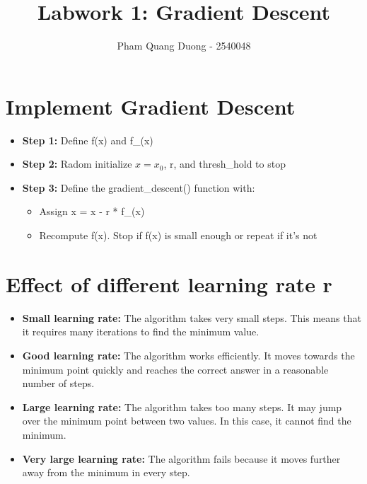 \documentclass{article}
\title{Labwork 1: Gradient Descent}
\author{Pham Quang Duong - 2540048}
\begin{document}
\maketitle


\section{Implement Gradient Descent}
\begin{itemize}
    \item[-] \textbf{Step 1:} Define f(x) and f\_(x)
    \item[-] \textbf{Step 2:} Radom initialize $x = x_0$, r, and thresh\_hold to stop
    \item[-] \textbf{Step 3:} Define the gradient\_descent() function with: 
    \begin{itemize}
        \item[$\bullet$]Assign x = x - r * f\_(x)
        \item[$\bullet$]Recompute f(x). Stop if f(x) is small enough or repeat if it's not
    \end{itemize}
\end{itemize}

\section{Effect of different learning rate r}
\begin{itemize}
    \item \textbf{Small learning rate:} The algorithm takes very small steps. This means that it requires many iterations to find the minimum value.
    
    \item \textbf{Good learning rate:} The algorithm works efficiently. It moves towards the minimum point quickly and reaches the correct answer in a reasonable number of steps.
    
    \item \textbf{Large learning rate:} The algorithm takes too many steps. It may jump over the minimum point between two values. In this case, it cannot find the minimum.
    
    \item \textbf{Very large learning rate:} The algorithm fails because it moves further away from the minimum in every step. 
\end{itemize}
\end{document}
